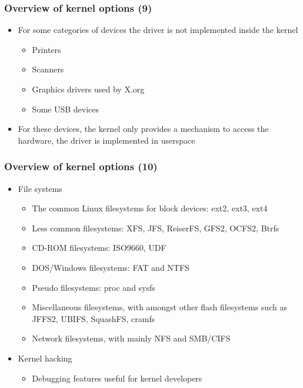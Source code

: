 \begin{frame}
  \frametitle{Overview of kernel options (9)}
  \begin{itemize}
  \item For some categories of devices the driver is not implemented
    inside the kernel
    \begin{itemize}
    \item Printers
    \item Scanners
    \item Graphics drivers used by X.org
    \item Some USB devices
    \end{itemize}
  \item For these devices, the kernel only provides a mechanism to
    access the hardware, the driver is implemented in userspace
  \end{itemize}
\end{frame}

\begin{frame}
  \frametitle{Overview of kernel options (10)}
  \begin{itemize}
  \item File systems
    \begin{itemize}
    \item The common Linux filesystems for block devices: ext2, ext3,
      ext4
    \item Less common filesystems: XFS, JFS, ReiserFS, GFS2, OCFS2,
      Btrfs
    \item CD-ROM filesystems: ISO9660, UDF
    \item DOS/Windows filesystems: FAT and NTFS
    \item Pseudo filesystems: proc and sysfs
    \item Miscellaneous filesystems, with amongst other flash
      filesystems such as JFFS2, UBIFS, SquashFS, cramfs
    \item Network filesystems, with mainly NFS and SMB/CIFS
    \end{itemize}
  \item Kernel hacking
    \begin{itemize}
    \item Debugging features useful for kernel developers
    \end{itemize}
  \end{itemize}
\end{frame}
